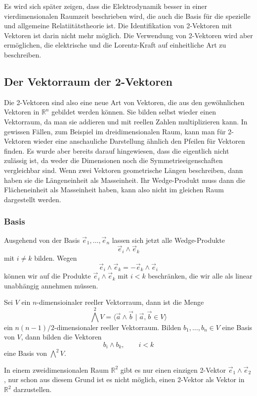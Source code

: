 Es wird sich später zeigen, dass die Elektrodynamik besser in einer
vierdimensionalen Raumzeit beschrieben wird, die auch die Basis für
die spezielle und allgemeine Relatiitätstheorie ist.
Die Identifikation von 2-Vektoren mit Vektoren ist darin nicht
mehr möglich.
Die Verwendung von 2-Vektoren wird aber ermöglichen, die elektrische 
und die Lorentz-Kraft auf einheitliche Art zu beschreiben.

%
%
\subsection{Der Vektorraum der 2-Vektoren}
Die 2-Vektoren sind also eine neue Art von Vektoren, die aus den
gewöhnlichen Vektoren in $\mathbb{R}^n$ gebildet werden können.
Sie bilden selbst wieder einen Vektorraum, da man sie addieren
und mit reellen Zahlen multiplizieren kann.
In gewissen Fällen, zum Beispiel im dreidimensionalen Raum, kann
man für 2-Vektoren wieder eine anschauliche Darstellung ähnlich den
Pfeilen für Vektoren finden.
Es wurde aber bereits darauf hingewiesen, dass die eigentlich nicht
zulässig ist, da weder die Dimensionen noch die Symmetrieeigenschaften
vergleichbar sind.
Wenn zwei Vektoren geometrische Längen beschreiben, dann haben sie
die Längeneinheit als Masseinheit.
Ihr Wedge-Produkt muss dann die Flächeneinheit als Masseinheit haben,
kann also nicht im gleichen Raum dargestellt werden.

\subsubsection{Basis}
Ausgehend von der Basis $\vec{e}_1,\dots,\vec{e}_n$ lassen sich jetzt
alle Wedge-Produkte
\[
\vec{e}_i\wedge \vec{e}_k
\]
mit $i\ne k$ bilden.
Wegen
\[
\vec{e}_i\wedge\vec{e}_k
=-
\vec{e}_k\wedge\vec{e}_i
\]
können wir auf die Produkte $\vec{e}_i\wedge\vec{e}_k$ mit $i<k$
beschränken, die wir alle als linear unabhängig annehmen müssen.

\begin{definition}
Sei $V$ ein $n$-dimensioinaler reeller Vektorraum, dann ist die Menge
\[
{\textstyle
\bigwedge^2 V}
= \langle \vec{a}\wedge\vec{b} \mid \vec{a},\vec{b}\in V \rangle
\]
ein $n(n-1)/2$-dimensionaler reeller Vektorraum.
Bilden $b_1,\dots,b_n\in V$  eine Basis von $V$, dann bilden die Vektoren
\[
b_i\wedge b_k,\qquad i<k
\]
eine Basis von $\bigwedge^2 V$.
\end{definition}

In einem zweidimensionalen Raum $\mathbb{R}^2$ gibt es nur einen
einzigen 2-Vektor $\vec{e}_1\wedge\vec{e}_2$, nur schon aus diesem
Grund ist es nicht möglich, einen 2-Vektor als Vektor in $\mathbb{R}^2$
darzustellen.

